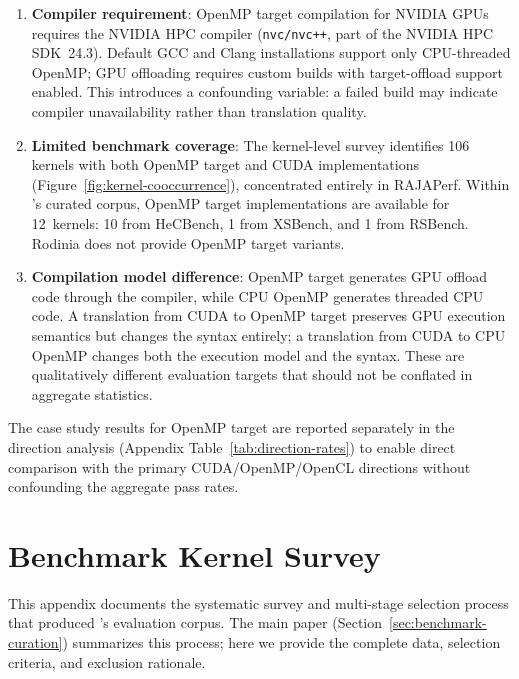 \begin{enumerate}
    \item \textbf{Compiler requirement}: OpenMP target compilation for NVIDIA GPUs requires the NVIDIA HPC compiler (\texttt{nvc/nvc++}, part of the NVIDIA HPC SDK~24.3). Default GCC and Clang installations support only CPU-threaded OpenMP; GPU offloading requires custom builds with target-offload support enabled. This introduces a confounding variable: a failed build may indicate compiler unavailability rather than translation quality.
    
    \item \textbf{Limited benchmark coverage}: The kernel-level survey identifies 106 kernels with both OpenMP target and CUDA implementations (Figure~\ref{fig:kernel-cooccurrence}), concentrated entirely in RAJAPerf. Within \parbench{}'s curated corpus, OpenMP target implementations are available for 12~kernels: 10 from HeCBench, 1 from XSBench, and 1 from RSBench. Rodinia does not provide OpenMP target variants.
    
    \item \textbf{Compilation model difference}: OpenMP target generates GPU offload code through the compiler, while CPU OpenMP generates threaded CPU code. A translation from CUDA to OpenMP target preserves GPU execution semantics but changes the syntax entirely; a translation from CUDA to CPU OpenMP changes both the execution model and the syntax. These are qualitatively different evaluation targets that should not be conflated in
    aggregate statistics.
\end{enumerate}

The case study results for OpenMP target are reported separately in the direction analysis (Appendix Table~\ref{tab:direction-rates}) to enable direct comparison with the primary CUDA/OpenMP/OpenCL directions without confounding the aggregate pass rates.
  

\section{Benchmark Kernel Survey}
\label{sec:appendix-c}

This appendix documents the systematic survey and multi-stage selection process that produced \parbench{}'s evaluation corpus. The main paper (Section~\ref{sec:benchmark-curation}) summarizes this process; here we provide the complete data, selection criteria,
and exclusion rationale.


